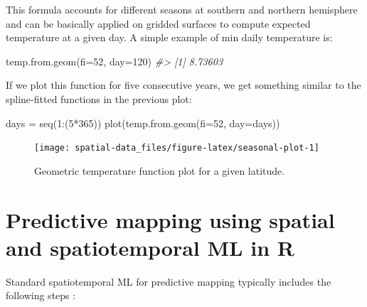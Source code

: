 \documentclass[
  graybox,natbib,nospthms]{svmono}
\newenvironment{Shaded}{\begin{snugshade}}{\end{snugshade}}
\newcommand{\AttributeTok}[1]{\textcolor[rgb]{0.61,0.61,0.61}{#1}}
\newcommand{\CommentTok}[1]{\textcolor[rgb]{0.37,0.37,0.37}{\textit{#1}}}
\newcommand{\DecValTok}[1]{\textcolor[rgb]{0.06,0.06,0.06}{#1}}
\newcommand{\FunctionTok}[1]{\textcolor[rgb]{0,0,0}{#1}}
\newcommand{\NormalTok}[1]{#1}
\newcommand{\OtherTok}[1]{\textcolor[rgb]{0.37,0.37,0.37}{#1}}
\newcommand{\SpecialCharTok}[1]{\textcolor[rgb]{0,0,0}{#1}}
\begin{document}
This formula accounts for different seasons at southern and northern
hemisphere and can be basically applied on gridded surfaces to compute expected
temperature at a given day. A simple example of min daily temperature is:

\begin{Shaded}
\begin{Highlighting}[]
\FunctionTok{temp.from.geom}\NormalTok{(}\AttributeTok{fi=}\DecValTok{52}\NormalTok{, }\AttributeTok{day=}\DecValTok{120}\NormalTok{)}
\CommentTok{\#\textgreater{} [1] 8.73603}
\end{Highlighting}
\end{Shaded}

If we plot this function for five consecutive years, we get something similar to the
spline-fitted functions in the previous plot:

\begin{Shaded}
\begin{Highlighting}[]
\NormalTok{days }\OtherTok{=} \FunctionTok{seq}\NormalTok{(}\DecValTok{1}\SpecialCharTok{:}\NormalTok{(}\DecValTok{5}\SpecialCharTok{*}\DecValTok{365}\NormalTok{))}
\FunctionTok{plot}\NormalTok{(}\FunctionTok{temp.from.geom}\NormalTok{(}\AttributeTok{fi=}\DecValTok{52}\NormalTok{, }\AttributeTok{day=}\NormalTok{days))}
\end{Highlighting}
\end{Shaded}

\begin{figure}

{\centering \texttt{[image: spatial-data\_files/figure-latex/seasonal-plot-1]} 

}

\caption{Geometric temperature function plot for a given latitude.}\label{fig:seasonal-plot}
\end{figure}

\hypertarget{predictive-mapping-using-spatial-and-spatiotemporal-ml-in-r}{%
\section{Predictive mapping using spatial and spatiotemporal ML in R}\label{predictive-mapping-using-spatial-and-spatiotemporal-ml-in-r}}

Standard spatiotemporal ML for predictive mapping typically includes the
following steps \citep{hengl2018random, hengl2019predictive}:
\end{document}
